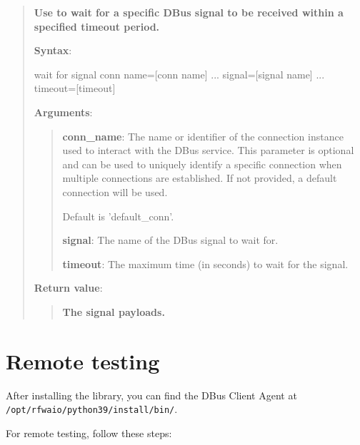 \begin{quote}
\textbf{Use to wait for a specific DBus signal to be received within a specified timeout period.}

\textbf{Syntax}:
\begin{robotcode}
wait for signal 	conn name=[conn name] 
...             	signal=[signal name] 
...             	timeout=[timeout]
\end{robotcode}

\textbf{Arguments}:

\begin{quote}
\textbf{conn\_name}: The name or identifier of the connection instance used to interact with the DBus service.
  This parameter is optional and can be used to uniquely identify a specific connection
  when multiple connections are established. If not provided, a default connection will be used.

  Default is 'default\_conn'.

\vspace{\baselineskip}

\textbf{signal}: The name of the DBus signal to wait for.

\vspace{\baselineskip}

\textbf{timeout}: The maximum time (in seconds) to wait for the signal.
\end{quote}

\textbf{Return value}:

\begin{quote}
\textbf{The signal payloads.}
\end{quote}
\end{quote}

\hypertarget{remote-testing}{%
\section{Remote testing}\label{remote-testing}}

After installing the library, you can find the DBus Client Agent at \texttt{/opt/rfwaio/python39/install/bin/}.

For remote testing, follow these steps:

